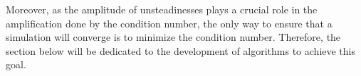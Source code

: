 Moreover, as the amplitude of unsteadinesses plays a crucial role in
the amplification done by the condition number, the only
way to ensure that a simulation will converge is 
to minimize the condition number.
Therefore, the section below will be dedicated to
the development of algorithms to achieve this goal.
